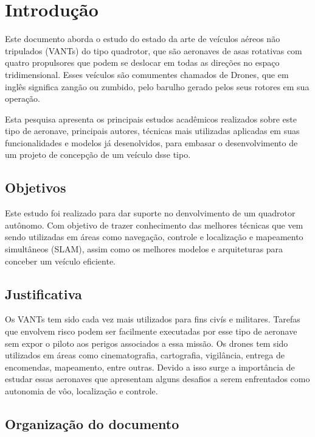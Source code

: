 \chapter{Introdução}
\label{chap:intro}

Este documento aborda o estudo do estado da arte de veículos aéreos não tripulados (VANTs) do tipo quadrotor, que são aeronaves de asas rotativas com quatro propulsores que podem se deslocar em todas as direções no espaço tridimensional. Esses veículos são comumentes chamados de Drones, que em inglês significa zangão ou zumbido, pelo barulho gerado pelos seus rotores em sua operação.

Esta pesquisa apresenta os principais estudos acadêmicos realizados sobre este tipo de aeronave, principais autores, técnicas mais utilizadas aplicadas em suas funcionalidades e modelos já desenolvidos, para embasar o desenvolvimento de um projeto de concepção de um veículo dsse tipo.

\section{Objetivos}
\label{sec:obj}

Este estudo foi realizado para dar suporte no denvolvimento de um quadrotor autônomo. Com objetivo de trazer conhecimento das melhores técnicas que vem sendo utilizadas em áreas como navegação, controle e localização e mapeamento simultâneos (SLAM), assim como os melhores modelos e arquiteturas para conceber um veículo eficiente.

\section{Justificativa}
\label{sec:justi}

Os VANTs tem sido cada vez mais utilizados para fins civís e militares. Tarefas que envolvem risco podem ser facilmente executadas por esse tipo de aeronave sem expor o piloto aos perigos associados a essa missão. Os drones tem sido utilizados em áreas como cinematografia, cartografia, vigilância, entrega de encomendas, mapeamento, entre outras. Devido a isso surge a importância de estudar essas aeronaves que apresentam alguns desafios a serem enfrentados como autonomia de vôo, localização e controle.

\section{Organização do documento}
\label{section:organizacao}

